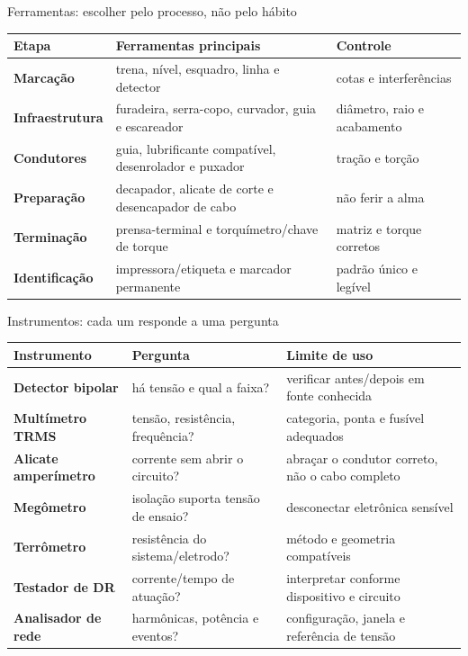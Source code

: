 \begin{frame}{Ferramentas: escolher pelo processo, não pelo hábito}
\small
\begin{tabularx}{\textwidth}{>{\bfseries}p{2.6cm}X X}
\toprule
Etapa & Ferramentas principais & Controle \\
\midrule
Marcação & trena, nível, esquadro, linha e detector & cotas e interferências \\
Infraestrutura & furadeira, serra-copo, curvador, guia e escareador & diâmetro, raio e acabamento \\
Condutores & guia, lubrificante compatível, desenrolador e puxador & tração e torção \\
Preparação & decapador, alicate de corte e desencapador de cabo & não ferir a alma \\
Terminação & prensa-terminal e torquímetro/chave de torque & matriz e torque corretos \\
Identificação & impressora/etiqueta e marcador permanente & padrão único e legível \\
\bottomrule
\end{tabularx}
\end{frame}

\begin{frame}{Instrumentos: cada um responde a uma pergunta}
\small
\begin{tabularx}{\textwidth}{>{\bfseries}p{2.9cm}X X}
\toprule
Instrumento & Pergunta & Limite de uso \\
\midrule
Detector bipolar & há tensão e qual a faixa? & verificar antes/depois em fonte conhecida \\
Multímetro TRMS & tensão, resistência, frequência? & categoria, ponta e fusível adequados \\
Alicate amperímetro & corrente sem abrir o circuito? & abraçar o condutor correto, não o cabo completo \\
Megômetro & isolação suporta tensão de ensaio? & desconectar eletrônica sensível \\
Terrômetro & resistência do sistema/eletrodo? & método e geometria compatíveis \\
Testador de DR & corrente/tempo de atuação? & interpretar conforme dispositivo e circuito \\
Analisador de rede & harmônicas, potência e eventos? & configuração, janela e referência de tensão \\
\bottomrule
\end{tabularx}
\end{frame}

